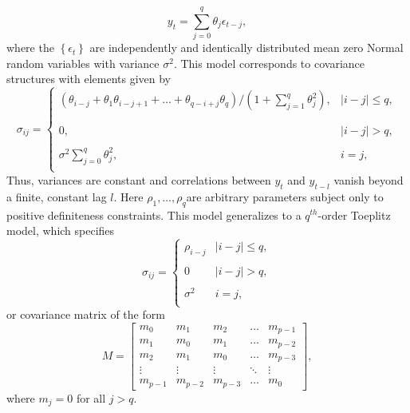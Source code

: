 \begin{equation}\label{eq:ma-q-model}
y_{t} = \sum_{j = 0}^{q} \theta_j \epsilon_{t-j},
\end{equation}
\bigskip
\noindent
where the $\left\{\epsilon_t\right\}$ are independently and identically distributed mean zero Normal random variables with variance $\sigma^2$. This model corresponds to covariance structures with elements given by
\begin{equation*}
\sigma_{ij} = \left\{ \begin{array}{ll}
\left(\theta_{i-j} + \theta_{1}\theta_{i-j +1} + \dots + \theta_{q-i+j}\theta_{q}\right)/\left(1 + \sum_{j = 1}^q \theta_j^2\right), & \vert i-j\vert \le q,\\ 
& \\
& \\
0, &  \vert i-j\vert > q, \\
& \\
\sigma^2 \sum\limits_{j = 0}^q \theta_j^2, & i = j,\\
\end{array}\right.
\end{equation*}
\bigskip
\noindent
Thus, variances are constant and correlations between $y_t$ and $y_{t-l}$ vanish beyond a finite, constant lag $l$. Here $\rho_1,\dots, \rho_q$are arbitrary parameters subject only to positive definiteness constraints. This model generalizes to a $q^{th}$-order Toeplitz model, which specifies
\begin{equation*}
\sigma_{ij} = \left\{ \begin{array}{ll}
\rho_{i-j} & \vert i - j \vert\le q, \\ 
&\\
0 & \vert i - j \vert >  q, \\ 
& \\
\sigma^2  & i = j,\\
\end{array}\right.
\end{equation*}
or covariance matrix of the form
\begin{equation}
M = \begin{bmatrix} m_0 & m_1 & m_2 & \dots & m_{p-1}\\ m_1 & m_0 & m_1 & \dots & m_{p-2}\\m_2 & m_1 & m_0 & \dots & m_{p-3}\\ \vdots & \vdots & \vdots & \ddots & \vdots\\  m_{p-1} & m_{p-2} & m_{p-3} & \dots & m_0 \end{bmatrix}, \label{toeplitz}
\end{equation}
\noindent
where $m_j = 0$ for all $j > q$.


